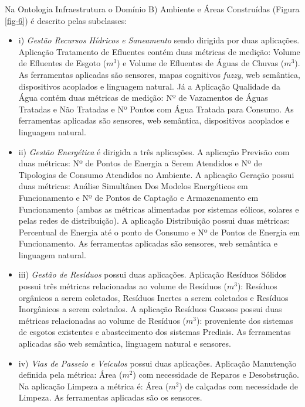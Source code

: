 \documentclass[portuguese]{textolivre}
\begin{document}
Na Ontologia Infraestrutura o Domínio B) Ambiente e Áreas Construídas (Figura \ref{fig-6}) é descrito pelas subclasses:
\medskip
\begin{itemize}
    \item i) \textit{Gestão Recursos Hídricos e Saneamento} sendo dirigida por duas aplicações. Aplicação Tratamento de Efluentes contém duas métricas de medição: Volume de Efluentes de Esgoto ($m^3$) e Volume de Efluentes de Águas de Chuvas ($m^3$). As ferramentas aplicadas são sensores, mapas cognitivos \textit{fuzzy}, web semântica, dispositivos acoplados e linguagem natural. Já a Aplicação Qualidade da Água contém duas métricas de medição: Nº de Vazamentos de Águas Tratadas e Não Tratadas e Nº Pontos com Água Tratada para Consumo. As ferramentas aplicadas são sensores, web semântica, dispositivos acoplados e linguagem natural.
    \item ii) \textit{Gestão Energética} é dirigida a três aplicações. A aplicação Previsão com duas métricas: Nº de Pontos de Energia a Serem Atendidos e Nº de Tipologias de Consumo Atendidos no Ambiente. A aplicação Geração possui duas métricas: Análise Simultânea Dos Modelos Energéticos em Funcionamento e Nº de Pontos de Captação e Armazenamento em Funcionamento (ambas as métricas alimentadas por sistemas eólicos, solares e pelas redes de distribuição). A aplicação Distribuição possui duas métricas: Percentual de Energia até o ponto de Consumo e Nº de Pontos de Energia em Funcionamento. As ferramentas aplicadas são sensores, web semântica e linguagem natural.
    \item iii) \textit{Gestão de Resíduos} possui duas aplicações. Aplicação Resíduos Sólidos possui três métricas relacionadas ao volume de Resíduos ($m^3$): Resíduos orgânicos a serem coletados, Resíduos Inertes a serem coletados e Resíduos Inorgânicos a serem coletados. A aplicação Resíduos Gasosos possui duas métricas relacionadas ao volume de Resíduos ($m^3$): proveniente dos sistemas de esgotos existentes e abastecimento dos sistemas Prediais. As ferramentas aplicadas são web semântica, linguagem natural e sensores.
    \item iv) \textit{Vias de Passeio e Veículos} possui duas aplicações. Aplicação Manutenção definida pela métrica: Área ($m^2$) com necessidade de Reparos e Desobstrução. Na aplicação Limpeza a métrica é: Área ($m^2$) de calçadas com necessidade de Limpeza. As ferramentas aplicadas são os sensores.

\end{itemize}
\end{document}
